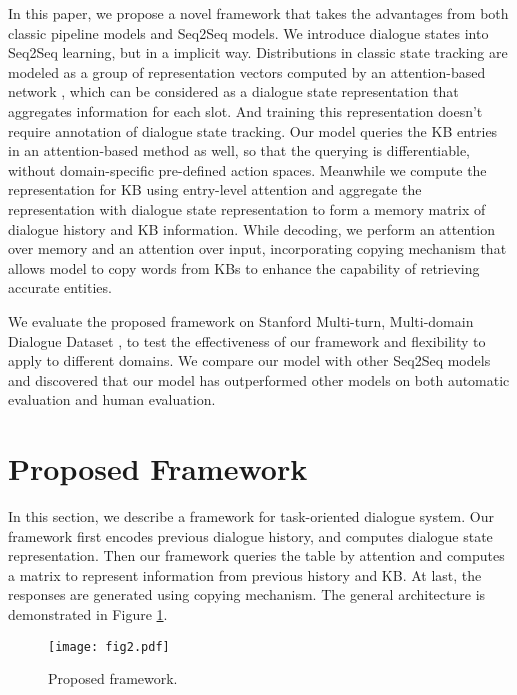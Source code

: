 \documentclass[11pt]{article}
\begin{document}
In this paper, we propose a novel framework that takes the advantages from both classic pipeline 
models and Seq2Seq models. We introduce dialogue states into 
Seq2Seq learning, but in a implicit way. Distributions in classic state tracking are modeled as a group of representation vectors computed by an attention-based network \cite{britz-guan-luong:2017:EMNLP},
which can be considered as a dialogue state representation that aggregates information for each slot. And training this representation doesn't require annotation of dialogue state tracking.
Our model queries the KB entries in an 
attention-based method as well, so that the querying is differentiable, without domain-specific pre-defined action spaces. Meanwhile we compute the representation for KB using entry-level attention and aggregate the representation with dialogue state representation to form a memory matrix of dialogue history and KB information.
While decoding, we perform an attention over memory and an attention over input, incorporating copying mechanism \cite{gu:2016:ACL} that allows model to copy words from KBs to enhance the capability of retrieving accurate entities.

We evaluate the proposed framework on Stanford Multi-turn, Multi-domain Dialogue Dataset 
\cite{eric:2017:SIGDial}, to test the effectiveness of our framework and flexibility to apply to different 
domains. We compare our model with other Seq2Seq models and discovered that our 
model has outperformed other models on both automatic evaluation and human evaluation.

\section{Proposed Framework}
In this section, we describe a framework for task-oriented dialogue system. 
Our framework first encodes previous dialogue history, and computes dialogue state representation. 
Then our framework queries the table by attention and computes a matrix to represent information from previous history and KB. 
At last, the responses are generated using copying mechanism. 
The general architecture is demonstrated in Figure \ref{fig22}. 
\begin{figure}[!tp]
\label{fig22}
 \texttt{[image: fig2.pdf]}
 \caption{Proposed framework.}
\end{figure}
\end{document}
